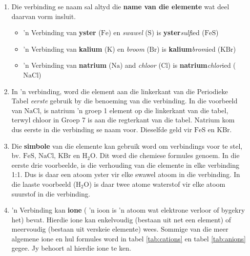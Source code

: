       \label{m38708*id64037}\begin{enumerate}[noitemsep, label=\textbf{\arabic*}. ] 
            \label{m38708*uid35}\item Die verbinding se naam sal altyd die \textbf{name van die elemente} wat deel daarvan vorm insluit.
\label{m38708*id64059}\begin{itemize}[noitemsep]
            \label{m38708*uid36}\item 'n Verbinding van \textbf{yster} ($\text{Fe}$) en \textsl{swawel} ($\text{S}$) is \textbf{yster}\textsl{sulf}ied ($\text{FeS}$)
\label{m38708*uid37}\item 'n Verbinding van \textbf{kalium} ($\text{K}$) en \textsl{broom} ($\text{Br}$) is \textbf{kalium}\textsl{brom}ied ($\text{KBr}$)
\label{m38708*uid38}\item 'n Verbinding van \textbf{natrium} ($\text{Na}$) and \textsl{chloor} ($\text{Cl}$) is \textbf{natrium}\textsl{chlor}ied ($\text{NaCl}$)
\end{itemize}
        \label{m38708*uid39}\item In 'n verbinding, word die element aan die linkerkant van die Periodieke Tabel \textsl{eerste} gebruik by die benoeming van die verbinding. In die voorbeeld van $\text{NaCl}$, is natrium 'n groep 1 element op die linkerkant van die tabel, terwyl chloor in Groep 7 is aan die regterkant van die tabel. Natrium kom dus eerste in die verbinding se naam voor. Dieselfde geld vir $\text{FeS}$ en $\text{KBr}$.
\label{m38708*uid40}\item Die \textbf{simbole} van die elemente kan gebruik word om verbindings voor te stel, bv. $\text{FeS}$, $\text{NaCl}$, $\text{KBr}$ en $\text{H}{}_{2}\text{O}$. Dit word die chemiese formules genoem. In die eerste drie voorbeelde, is die verhouding van die elemente in elke verbinding 1:1. Dus is daar een atoom yster vir elke swawel atoom in die verbinding. In die laaste voorbeeld ($\text{H}{}_{2}\text{O}$) is daar twee atome waterstof vir elke atoom suurstof in die verbinding.
\item 'n Verbinding kan \textbf{ione} ( 'n ioon is 'n atoom wat elektrone verloor of bygekry het) bevat. Hierdie ione kan enkelvoudig (bestaan uit net een element) of meervoudig (bestaan uit verskeie elemente) wees. Sommige van die meer algemene ione en hul formules word in tabel \ref{tab:cations} en tabel \ref{tab:anions} gegee. Jy behoort al hierdie ione te ken.



\end{enumerate}
